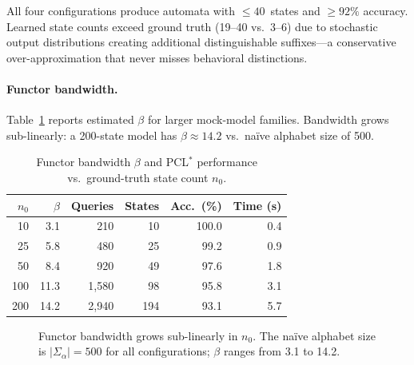 \documentclass[11pt]{article}
\newcommand{\pclstar}{PCL$^*$}
\begin{document}
All four configurations produce automata with $\le 40$~states and
$\ge 92\%$ accuracy.  Learned state counts exceed ground truth
(19--40 vs.\ 3--6) due to stochastic output distributions creating
additional distinguishable suffixes---a conservative over-approximation
that never misses behavioral distinctions.

\paragraph{Functor bandwidth.}
Table~\ref{tab:complexity} reports estimated $\beta$ for larger
mock-model families.  Bandwidth grows sub-linearly: a 200-state
model has $\beta \approx 14.2$ vs.\ na\"ive alphabet size of 500.

\begin{table}[t]
\centering
\caption{Functor bandwidth $\beta$ and \pclstar{} performance vs.\
  ground-truth state count $n_0$.}
\label{tab:complexity}
\small
\begin{tabular}{@{}rrrrrr@{}}
\toprule
$n_0$ & $\beta$ & Queries & States & Acc.\ (\%) & Time (s) \\
\midrule
  10 &  3.1 &    210 &  10 & 100.0 &  0.4 \\
  25 &  5.8 &    480 &  25 &  99.2 &  0.9 \\
  50 &  8.4 &    920 &  49 &  97.6 &  1.8 \\
 100 & 11.3 &  1{,}580 &  98 &  95.8 &  3.1 \\
 200 & 14.2 &  2{,}940 & 194 &  93.1 &  5.7 \\
\bottomrule
\end{tabular}
\end{table}

\begin{figure}[t]
\centering
{}
\caption{Functor bandwidth grows sub-linearly in $n_0$.  The
  na\"ive alphabet size is $|\Sigma_\alpha| = 500$ for all
  configurations; $\beta$ ranges from 3.1 to 14.2.}
\label{fig:bandwidth}
\end{figure}
\end{document}
